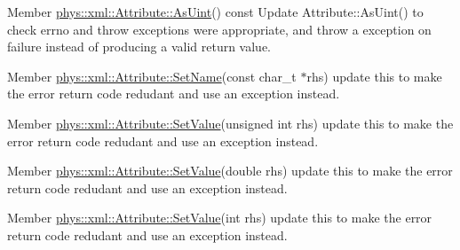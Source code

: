 \begin{DoxyDescription}
\item[Member \hyperlink{classphys_1_1xml_1_1Attribute_ad00ec5857fc4afcda892a0057419a9a0}{phys::xml::Attribute::AsUint}() const  ]Update Attribute::AsUint() to check errno and throw exceptions were appropriate, and throw a exception on failure instead of producing a valid return value. 
\end{DoxyDescription}

\label{dd/da0/todo__todo000050}
\hypertarget{dd/da0/todo__todo000050}{}
 
\begin{DoxyDescription}
\item[Member \hyperlink{classphys_1_1xml_1_1Attribute_af669654308122897f98858563375bf4c}{phys::xml::Attribute::SetName}(const char\_\-t $\ast$rhs) ]update this to make the error return code redudant and use an exception instead. 
\end{DoxyDescription}

\label{dd/da0/todo__todo000042}
\hypertarget{dd/da0/todo__todo000042}{}
 
\begin{DoxyDescription}
\item[Member \hyperlink{classphys_1_1xml_1_1Attribute_a289ac36b218f3912224fd904ccade1ed}{phys::xml::Attribute::SetValue}(unsigned int rhs) ]update this to make the error return code redudant and use an exception instead. 
\end{DoxyDescription}

\label{dd/da0/todo__todo000043}
\hypertarget{dd/da0/todo__todo000043}{}
 
\begin{DoxyDescription}
\item[Member \hyperlink{classphys_1_1xml_1_1Attribute_a919034671f61ee408d616409a49dafca}{phys::xml::Attribute::SetValue}(double rhs) ]update this to make the error return code redudant and use an exception instead. 
\end{DoxyDescription}

\label{dd/da0/todo__todo000041}
\hypertarget{dd/da0/todo__todo000041}{}
 
\begin{DoxyDescription}
\item[Member \hyperlink{classphys_1_1xml_1_1Attribute_a693f7bd8015866c3c4979101c343ce50}{phys::xml::Attribute::SetValue}(int rhs) ]update this to make the error return code redudant and use an exception instead. 
\end{DoxyDescription}

